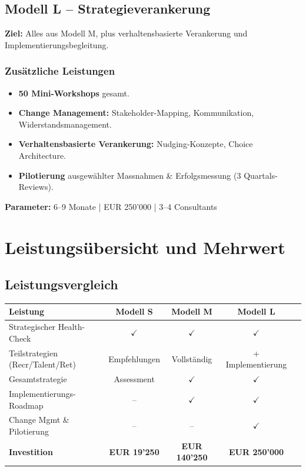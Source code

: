 \documentclass[11pt,a4paper]{article}
\begin{document}
\newpage

\subsection{Modell L -- Strategieverankerung}

\textbf{Ziel:} Alles aus Modell M, plus verhaltensbasierte Verankerung und Implementierungsbegleitung.

\subsubsection*{Zusätzliche Leistungen}
\begin{itemize}
    \item \textbf{50 Mini-Workshops} gesamt.
    \item \textbf{Change Management:} Stakeholder-Mapping, Kommunikation, Widerstandsmanagement.
    \item \textbf{Verhaltensbasierte Verankerung:} Nudging-Konzepte, Choice Architecture.
    \item \textbf{Pilotierung} ausgewählter Massnahmen \& Erfolgsmessung (3 Quartals-Reviews).
\end{itemize}

\textbf{Parameter:} 6--9 Monate | EUR 250'000 | 3--4 Consultants

\section{Leistungsübersicht und Mehrwert}

\subsection{Leistungsvergleich}

\begin{table}[h]
\centering
\small
\begin{tabular}{lcccc}
\toprule
\textbf{Leistung} & \textbf{Modell S} & \textbf{Modell M} & \textbf{Modell L} \\
\midrule
Strategischer Health-Check & $\checkmark$ & $\checkmark$ & $\checkmark$ \\
Teilstrategien (Recr/Talent/Ret) & Empfehlungen & Vollständig & + Implementierung \\
Gesamtstrategie & Assessment & $\checkmark$ & $\checkmark$ \\
Implementierungs-Roadmap & -- & $\checkmark$ & $\checkmark$ \\
Change Mgmt \& Pilotierung & -- & -- & $\checkmark$ \\
\midrule
\textbf{Investition} & \textbf{EUR 19'250} & \textbf{EUR 140'250} & \textbf{EUR 250'000} \\
\bottomrule
\end{tabular}
\end{table}
\end{document}

